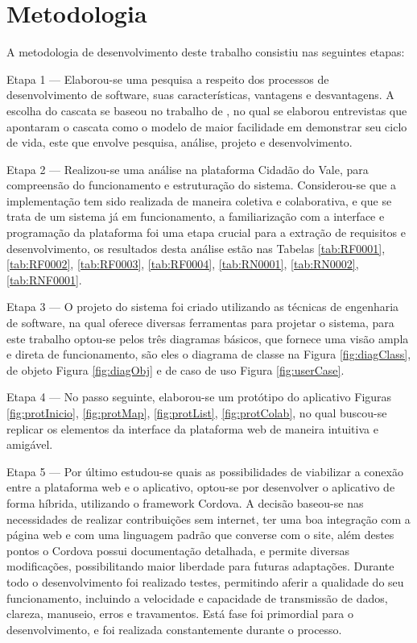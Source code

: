 \chapter{Metodologia}
\begin{flushleft}
	A metodologia de desenvolvimento deste trabalho consistiu nas seguintes etapas:
\end{flushleft}
Etapa 1 — Elaborou-se uma pesquisa a respeito dos processos de desenvolvimento de software, suas características, vantagens e desvantagens. A escolha do cascata se baseou no trabalho de , no qual se elaborou entrevistas que apontaram o cascata como o modelo de maior facilidade em demonstrar seu ciclo de vida, este que envolve pesquisa, análise, projeto e desenvolvimento.

Etapa 2 — Realizou-se uma análise na plataforma Cidadão do Vale, para compreensão do funcionamento e estruturação do sistema. Considerou-se que a implementação tem sido realizada de maneira coletiva e colaborativa, e que se trata de um sistema já em funcionamento, a familiarização com a interface e programação da plataforma foi uma etapa crucial para a extração de requisitos e desenvolvimento, os resultados desta análise estão nas Tabelas \ref{tab:RF0001}, \ref{tab:RF0002}, \ref{tab:RF0003}, \ref{tab:RF0004}, \ref{tab:RN0001}, \ref{tab:RN0002}, \ref{tab:RNF0001}.

Etapa 3 — O projeto do sistema foi criado utilizando as técnicas de engenharia de software, na qual oferece diversas ferramentas para projetar o sistema, para este trabalho optou-se pelos três diagramas básicos, que fornece uma visão ampla e direta de funcionamento, são eles o diagrama de classe na Figura \ref{fig:diagClass}, de objeto Figura \ref{fig:diagObj} e de caso de uso Figura \ref{fig:userCase}.

Etapa 4 — No passo seguinte, elaborou-se um protótipo do aplicativo Figuras \ref{fig:protInicio}, \ref{fig:protMap}, \ref{fig:protList}, \ref{fig:protColab}, no qual buscou-se replicar os elementos da interface da plataforma web de maneira intuitiva e amigável.

Etapa 5 — Por último estudou-se quais as possibilidades de viabilizar a conexão entre a plataforma web e o aplicativo, optou-se por desenvolver o aplicativo de forma híbrida, utilizando o framework Cordova. A decisão baseou-se nas necessidades de realizar contribuições sem internet, ter uma boa integração com a página web e com uma linguagem padrão que converse com o site, além destes pontos o Cordova possui documentação detalhada, e permite diversas modificações, possibilitando maior liberdade para futuras adaptações. Durante todo o desenvolvimento foi realizado testes, permitindo aferir a qualidade do seu funcionamento, incluindo a velocidade e capacidade de transmissão de dados, clareza, manuseio, erros e travamentos. Está fase foi primordial para o desenvolvimento, e foi realizada constantemente durante o processo.

